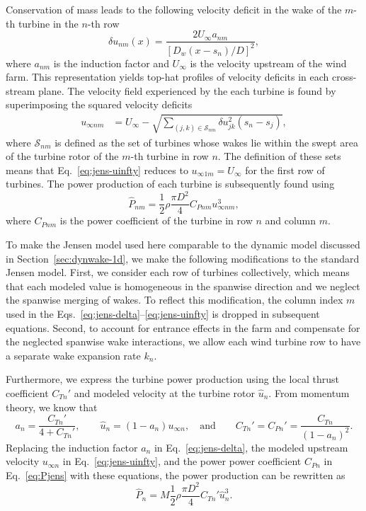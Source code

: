 Conservation of mass leads to the following velocity deficit in the wake of the $m$-th turbine in the $n$-th row
\begin{equation}
\label{eq:jens-delta}
\delta u_{nm}(x)  = \frac{2 U_\infty a_{nm}}{\left[D_w(x-s_n)/D\right]^2},
\end{equation}
where $a_{nm}$ is the induction factor and $U_\infty$ is the velocity upstream of the wind farm. This representation yields top-hat profiles of velocity deficits in each cross-stream plane. The velocity field experienced by the each turbine is found by superimposing the squared velocity deficits
\begin{align}
\label{eq:jens-uinfty}
u_{\infty nm} &= U_\infty -\sqrt{ \sum_{(j,k) \in \mathcal{S}_{nm}} \delta u_{jk}^2(s_n-s_j)},
\end{align}
where $\mathcal{S}_{nm}$ is defined as the set of turbines whose wakes lie within the swept area of the turbine rotor of the $m$-th turbine in row $n$. The definition of these sets means that Eq.~\eqref{eq:jens-uinfty} reduces to $u_{\infty1m} = U_\infty$ for the first row of turbines. The power production of each turbine is subsequently found using 
\begin{equation}
\label{eq:Pjens}
\hat{P}_{nm} = \frac{1}{2}\rho\frac{\pi D^2}{4} C_{Pnm} u_{\infty nm}^3,
\end{equation}
where $C_{P nm}$ is the power coefficient of the turbine in row $n$ and column $m$.

To make the Jensen model used here comparable to the dynamic model discussed in Section~\ref{sec:dynwake-1d}, we make the following modifications to the standard Jensen model. First, we consider each row of turbines collectively, which means that each modeled value is homogeneous in the spanwise direction and we neglect the spanwise merging of wakes. To reflect this modification, the column index $m$ used in the Eqs.~\eqref{eq:jens-delta}--\eqref{eq:jens-uinfty} is dropped in subsequent equations. Second, to account for entrance effects in the farm and compensate for the neglected spanwise wake interactions, we allow each wind turbine row to have a separate wake expansion rate $k_n$. 

Furthermore, we express the turbine power production using the local thrust coefficient $C_{Tn}'$ and modeled velocity at the turbine rotor $\hat{u}_n$. From momentum theory, we know that
\begin{equation}
\label{eq:relationships}
a_n = \frac{C_{Tn}'}{4+C_{Tn}'}, \qquad \hat{u}_n = (1-a_n) u_{\infty n}, \quad \text{and}  \qquad  C_{Tn}' = C_{Pn}' = \frac{C_{Tn}}{(1-a_n)^2}.
\end{equation}
Replacing  the induction factor $a_n$ in Eq.~\eqref{eq:jens-delta},  the modeled upstream velocity $u_{\infty n}$ in Eq.~\eqref{eq:jens-uinfty}, and the power power coefficient $C_{Pn}$ in Eq.~\eqref{eq:Pjens} with these equations, the power production can be rewritten as 
\begin{equation}
\label{eq:power-hat}
\hat{P}_{n} = M\frac{1}{2}\rho\frac{\pi D^2}{4} C_{Tn}' \hat{u}_n^3.
\end{equation}

